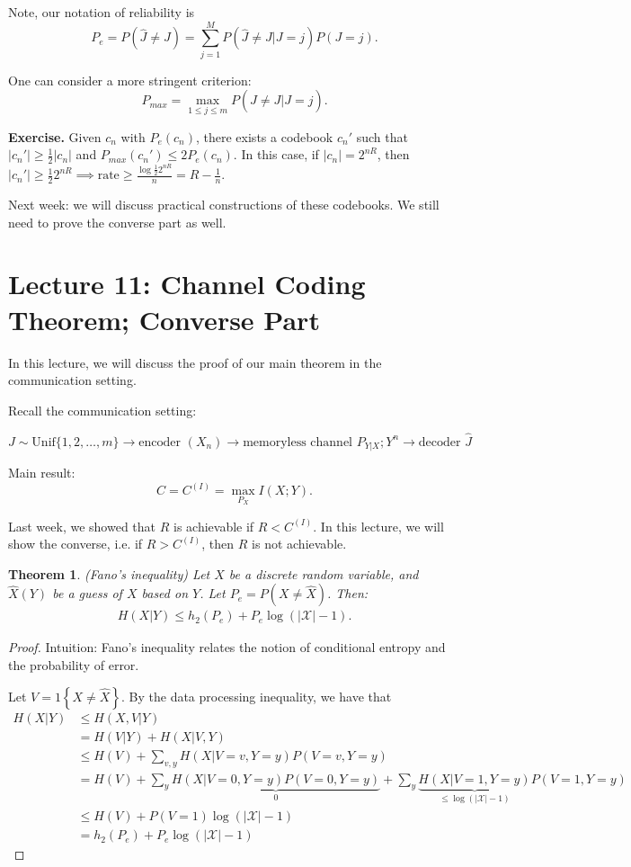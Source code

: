 \documentclass[13pt]{article}
\newtheorem*{theorem}{Theorem}
\newcommand{\T}{\text}
\def\ub{\underbrace}
\def\XX{\mathcal{X}}
\def\Unif{\text{Unif}}
\def\Xh{\hat{X}}
\begin{document}
Note, our notation of reliability is
\[
  P_e = P(\hat{J} \neq J) = \sum_{j=1}^{M} P(\hat{J} \neq J | J = j) P(J = j).
\]

One can consider a more stringent criterion:
\[
  P_{max} = \max_{1 \leq j \leq m} P(\hat{J} \neq J | J = j).
\]

{\bf Exercise.} Given $c_n$ with $P_e (c_n)$, there exists a codebook $c_n'$ such that $|c_n'| \geq \frac{1}{2} |c_n|$ and $P_{max} (c_n') \leq 2 P_e (c_n)$.  In this case, if $|c_n| = 2^{nR}$, then $|c_n'| \geq \frac{1}{2} 2^{nR} \implies \T{rate} \geq \frac{\log \frac{1}{2} 2^{nR}}{n} = R - \frac{1}{n}.$

Next week: we will discuss practical constructions of these codebooks.  We still need to prove the converse part as well.


\section{Lecture 11: Channel Coding Theorem; Converse Part}

In this lecture, we will discuss the proof of our main theorem in the communication setting.

Recall the communication setting:

\[
  J \sim \Unif\{1, 2, \dots, m \} \to \text{encoder $(X_n)$} \to \text{memoryless channel $P_{Y|X}; Y^n$} \to \text{decoder $\hat{J}$} 
\]

Main result:
\[
  C = C^{(I)} = \max_{P_X} I(X; Y).
\]

Last week, we showed that $R$ is achievable if $R < C^{(I)}$.  In this lecture, we will show the converse, i.e. if $R > C^{(I)}$, then $R$ is not achievable.

\begin{theorem}
  (Fano's inequality) Let $X$ be a discrete random variable, and $\Xh(Y)$ be a guess of $X$ based on $Y$.  Let $P_e = P(X \neq \Xh)$.  Then:
  \begin{align*}
    H(X|Y) \leq h_2(P_e) + P_e \log (|\XX| - 1).
  \end{align*}
\end{theorem}

\begin{proof}
  Intuition: Fano's inequality relates the notion of conditional entropy and the probability of error.

  Let $V = 1\left\{ X \neq \Xh \right\}$.  By the data processing inequality, we have that
  \begin{align*}
    H(X|Y) & \leq H(X, V | Y) \\
    &= H(V | Y) + H(X | V, Y) \tag{chain rule}\\
    & \leq H(V) + \sum_{v, y} H(X | V = v, Y = y) P(V=v, Y=y) \tag{conditioning reduces entropy} \\
    &= H(V) + \sum_{y} \ub{H(X | V = 0, Y = y) P (V = 0, Y = y)}_{0} + \sum_{y} \ub{H(X | V = 1, Y = y)}_{\leq \log (|\XX| - 1)} P(V = 1, Y = y) \\
    &\leq H(V) + P(V=1) \log (|\XX| - 1)  \\
    &= h_2(P_e) + P_e \log (|\XX| - 1)
  \end{align*}
\end{proof}
\end{document}
